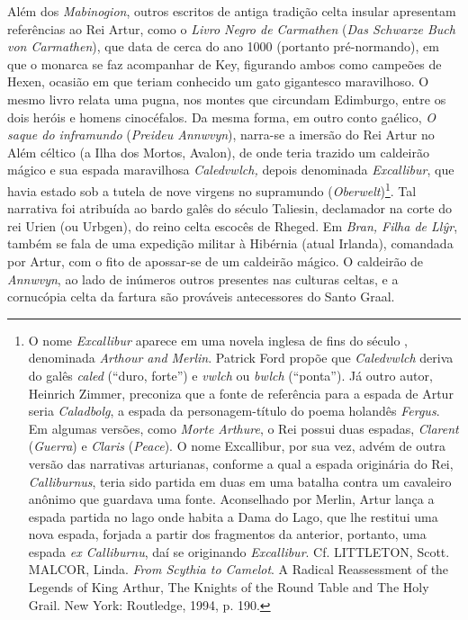 Além dos \textit{Mabinogion}, outros escritos de antiga tradição celta insular
apresentam referências ao Rei Artur, como o \textit{Livro Negro de Carmathen}
(\textit{Das Schwarze Buch von Carmathen}), que data de cerca do ano 1000
(portanto pré-normando), em que o monarca se faz acompanhar de Key, figurando
ambos como campeões de Hexen, ocasião em que teriam conhecido um gato
gigantesco maravilhoso. O mesmo livro relata uma pugna, nos montes que
circundam Edimburgo, entre os dois heróis e homens cinocéfalos. Da mesma forma,
em outro conto gaélico, \textit{O saque do inframundo} (\textit{Preideu
Annwvyn}), narra-se a imersão do Rei Artur no Além céltico (a Ilha dos Mortos,
Avalon), de onde teria trazido um caldeirão mágico e sua espada maravilhosa
\textit{Caledvwlch,} depois denominada \textit{Excallibur}, que havia estado
sob a tutela de nove virgens no supramundo (\textit{Oberwelt})\footnote{ O nome
\textit{Excallibur} aparece em uma novela inglesa de fins do século ,
denominada \textit{Arthour and Merlin}. Patrick Ford propõe que
\textit{Caledvwlch }deriva do galês \textit{caled} (“duro, forte”) e
\textit{vwlch }ou \textit{bwlch} (“ponta”). Já outro autor, Heinrich Zimmer,
preconiza que a fonte de referência para a espada de Artur seria
\textit{Caladbolg}, a espada da personagem-título do poema holandês
\textit{Fergus}. Em algumas versões, como \textit{Morte Arthure}, o Rei possui
duas espadas, \textit{Clarent} (\textit{Guerra}) e \textit{Claris}
(\textit{Peace}). O nome Excallibur, por sua vez, advém de outra versão das
narrativas arturianas, conforme a qual a espada originária do Rei,
\textit{Calliburnus}, teria sido partida em duas em uma batalha contra um
cavaleiro anônimo que guardava uma fonte. Aconselhado por Merlin, Artur lança a
espada partida no lago onde habita a Dama do Lago, que lhe restitui uma nova
espada, forjada a partir dos fragmentos da anterior, portanto, uma espada
\textit{ex Calliburnu}, daí se originando \textit{Excallibur}.\textit{ }Cf.
LITTLETON, Scott. MALCOR, Linda. \textit{From Scythia to Camelot}. A Radical
Reassessment of the Legends of King Arthur, The Knights of the Round Table and
The Holy Grail. New York: Routledge, 1994, p. 190. }. Tal narrativa foi
atribuída ao bardo galês do século  Taliesin, declamador na corte do rei
Urien (ou Urbgen), do reino celta escocês de Rheged. Em \textit{Bran, Filha de
Ll\^yr}, também se fala de uma expedição militar à Hibérnia (atual Irlanda),
comandada por Artur, com o fito de apossar-se de um caldeirão mágico. O
caldeirão de \textit{Annwvyn}, ao lado de inúmeros outros presentes nas
culturas celtas, e a cornucópia celta da fartura são prováveis antecessores do
Santo Graal. 

